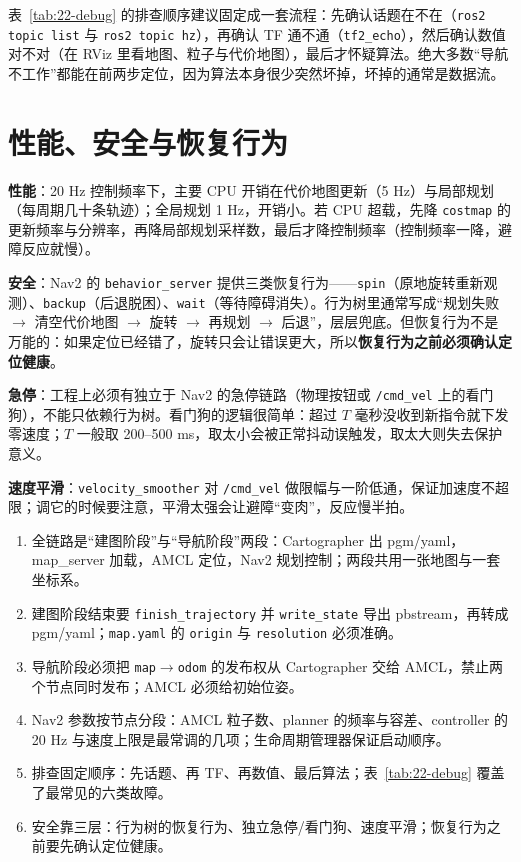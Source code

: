 表~\ref{tab:22-debug} 的排查顺序建议固定成一套流程：先确认话题在不在（\texttt{ros2 topic list} 与 \texttt{ros2 topic hz}），再确认 TF 通不通（\texttt{tf2\_echo}），然后确认数值对不对（在 RViz 里看地图、粒子与代价地图），最后才怀疑算法。绝大多数“导航不工作”都能在前两步定位，因为算法本身很少突然坏掉，坏掉的通常是数据流。

\section{性能、安全与恢复行为}\label{sec:22-safety}

\textbf{性能}：20 Hz 控制频率下，主要 CPU 开销在代价地图更新（5 Hz）与局部规划（每周期几十条轨迹）；全局规划 1 Hz，开销小。若 CPU 超载，先降 \texttt{costmap} 的更新频率与分辨率，再降局部规划采样数，最后才降控制频率（控制频率一降，避障反应就慢）。

\textbf{安全}：Nav2 的 \texttt{behavior\_server} 提供三类恢复行为——\texttt{spin}（原地旋转重新观测）、\texttt{backup}（后退脱困）、\texttt{wait}（等待障碍消失）。行为树里通常写成“规划失败 $\rightarrow$ 清空代价地图 $\rightarrow$ 旋转 $\rightarrow$ 再规划 $\rightarrow$ 后退”，层层兜底。但恢复行为不是万能的：如果定位已经错了，旋转只会让错误更大，所以\textbf{恢复行为之前必须确认定位健康}。

\textbf{急停}：工程上必须有独立于 Nav2 的急停链路（物理按钮或 \texttt{/cmd\_vel} 上的看门狗），不能只依赖行为树。看门狗的逻辑很简单：超过 $T$ 毫秒没收到新指令就下发零速度；$T$ 一般取 200--500 ms，取太小会被正常抖动误触发，取太大则失去保护意义。

\textbf{速度平滑}：\texttt{velocity\_smoother} 对 \texttt{/cmd\_vel} 做限幅与一阶低通，保证加速度不超限；调它的时候要注意，平滑太强会让避障“变肉”，反应慢半拍。

\begin{summary}

\begin{enumerate}
  \item 全链路是“建图阶段”与“导航阶段”两段：Cartographer 出 pgm/yaml，map\_server 加载，AMCL 定位，Nav2 规划控制；两段共用一张地图与一套坐标系。
  \item 建图阶段结束要 \texttt{finish\_trajectory} 并 \texttt{write\_state} 导出 pbstream，再转成 pgm/yaml；\texttt{map.yaml} 的 \texttt{origin} 与 \texttt{resolution} 必须准确。
  \item 导航阶段必须把 \texttt{map}$\to$\texttt{odom} 的发布权从 Cartographer 交给 AMCL，禁止两个节点同时发布；AMCL 必须给初始位姿。
  \item Nav2 参数按节点分段：AMCL 粒子数、planner 的频率与容差、controller 的 20 Hz 与速度上限是最常调的几项；生命周期管理器保证启动顺序。
  \item 排查固定顺序：先话题、再 TF、再数值、最后算法；表~\ref{tab:22-debug} 覆盖了最常见的六类故障。
  \item 安全靠三层：行为树的恢复行为、独立急停/看门狗、速度平滑；恢复行为之前要先确认定位健康。
\end{enumerate}


\end{summary}

